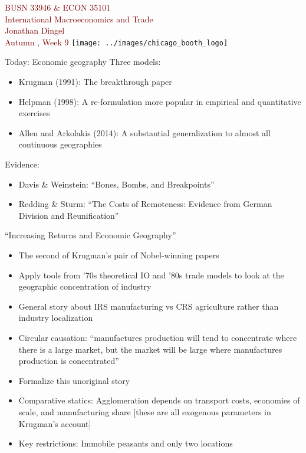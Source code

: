 \documentclass[10pt,notes=hide]{beamer}
\begin{document}
\begin{frame}[plain]
\begin{center}
\large
\textcolor{maroon}{BUSN 33946 \& ECON 35101\\
International Macroeconomics and Trade\\ 
Jonathan Dingel\\
Autumn \the\year, Week 9}
\vfill 
\texttt{[image: ../images/chicago\_booth\_logo]}
\end{center}
\end{frame}
\begin{frame}{Today: Economic geography}
Three models:
\begin{itemize}
	\item Krugman (1991): The breakthrough paper
	\item Helpman (1998): A re-formulation more popular in empirical and quantitative exercises
	\item Allen and Arkolakis (2014): A substantial generalization to almost all continuous geographies
\end{itemize}
Evidence:
\begin{itemize}
	\item Davis \& Weinstein: ``Bones, Bombs, and Breakpoints''
	\item Redding \& Sturm: ``The Costs of Remoteness: Evidence from German Division and Reunification''
\end{itemize}
\end{frame}
\begin{frame}{``Increasing Returns and Economic Geography''}
\begin{itemize}
	\item The second of Krugman's pair of Nobel-winning papers
	\item Apply tools from '70s theoretical IO and '80s trade models to look at the geographic concentration of industry
	\item General story about IRS manufacturing vs CRS agriculture rather than industry localization
	\item Circular causation: ``manufactures production will tend to concentrate where there is a large market, but the market will be large where manufactures production is concentrated''
	\item Formalize this unoriginal story
	\item Comparative statics: Agglomeration depends on transport costs, economies of scale, and manufacturing share [these are all exogenous parameters in Krugman's account]
	\item Key restrictions: Immobile peasants and only two locations
\end{itemize}
\end{frame}
\end{document}
